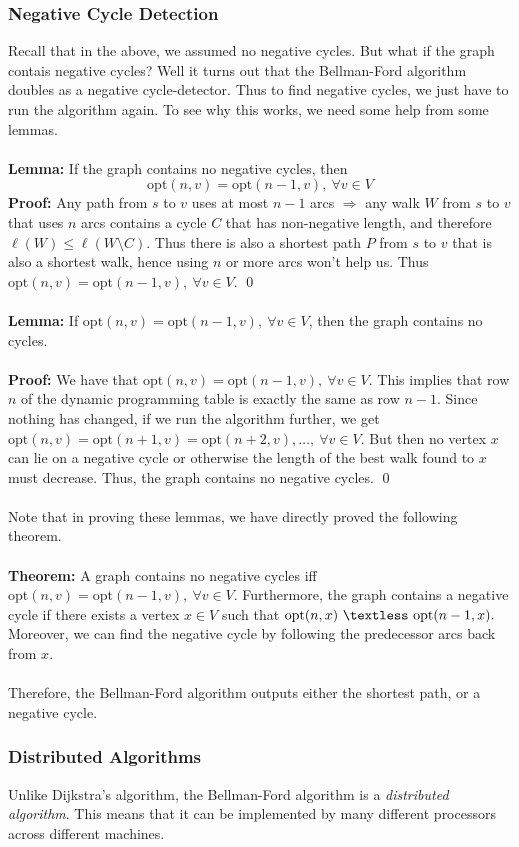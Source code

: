 \documentclass{article}
\newcommand{\ti}[1]{\textit{#1}}
\newcommand{\lt}{\textless}
\newcommand{\imply}{\Rightarrow}
\newcommand{\thm}{\textbf{Theorem: }}
\newcommand{\lem}{\textbf{Lemma: }}
\newcommand{\proo}{\textbf{Proof: }}
\newcommand{\opt}{\text{opt}}
\newcommand{\sm}{\setminus}
\begin{document}
\subsubsection{Negative Cycle Detection}
Recall that in the above, we assumed no negative cycles. But what if the graph contais negative cycles? Well it turns out that the Bellman-Ford algorithm doubles as a negative cycle-detector. Thus to find negative cycles, we just have to run the algorithm again. To see why this works, we need some help from some lemmas.\\\\
\lem If the graph contains no negative cycles, then
\[\opt(n, v) = \opt(n-1, v),\ \forall v \in V\]
\proo Any path from $s$ to $v$ uses at most $n-1$ arcs $\imply$ any walk $W$ from $s$ to $v$ that uses $n$ arcs contains a cycle $C$ that has non-negative length, and therefore $\ell(W) \leq \ell(W\sm C)$. Thus there is also a shortest path $P$ from $s$ to $v$ that is also a shortest walk, hence using $n$ or more arcs won't help us. Thus $\opt(n, v) = \opt(n-1, v),\ \forall v \in V$.
\qed\\\\
\lem If $\opt(n, v) = \opt(n-1, v),\ \forall v \in V$, then the graph contains no cycles.\\\\
\proo We have that $\opt(n, v) = \opt(n-1, v),\ \forall v \in V$. This implies that row $n$ of the dynamic programming table is exactly the same as row $n-1$. Since nothing has changed, if we run the algorithm further, we get $\opt(n, v) = \opt(n+1, v) = \opt(n+2, v), \dots,\ \forall v \in V$. But then no vertex $x$ can lie on a negative cycle or otherwise the length of the best walk found to $x$ must decrease. Thus, the graph contains no negative cycles.
\qed\\\\
Note that in proving these lemmas, we have directly proved the following theorem.\\\\
\thm A graph contains no negative cycles iff $\opt(n, v) = \opt(n-1, v),\ \forall v \in V$. Furthermore, the graph contains a negative cycle if there exists a vertex $x \in V$ such that $\opt(n, x)\ \lt\ \opt(n-1, x).$ Moreover, we can find the negative cycle by following the predecessor arcs back from $x$.\\\\
Therefore, the Bellman-Ford algorithm outputs either the shortest path, or a negative cycle.
\subsubsection{Distributed Algorithms}
Unlike Dijkstra's algorithm, the Bellman-Ford algorithm is a \ti{distributed algorithm}. This means that it can be implemented by many different processors across different machines.
\end{document}
